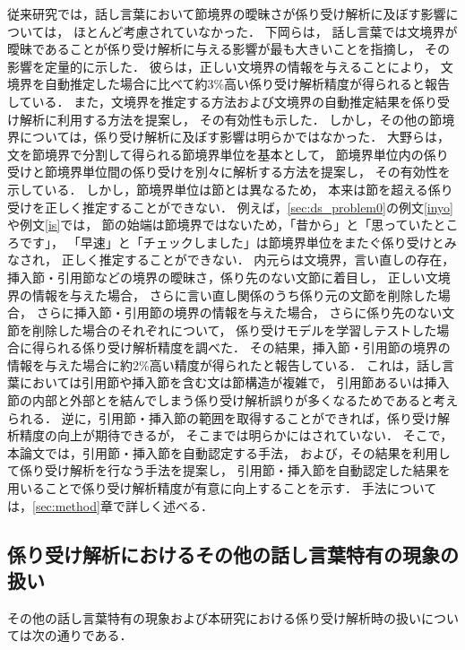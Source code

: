 \documentclass[japanese]{jnlp_1.4}
\begin{document}
従来研究では，話し言葉において節境界の曖昧さが係り受け解析に及ぼす影響については，
ほとんど考慮されていなかった．
下岡ら\cite{shitaoka_2005}は，
話し言葉では文境界が曖昧であることが係り受け解析に与える影響が最も大きいことを指摘し，
その影響を定量的に示した．
彼らは，正しい文境界の情報を与えることにより，
文境界を自動推定した場合に比べて約3\%高い係り受け解析精度が得られると報告している．
また，文境界を推定する方法および文境界の自動推定結果を係り受け解析に利用する方法を提案し，
その有効性も示した．
しかし，その他の節境界については，係り受け解析に及ぼす影響は明らかではなかった．
大野ら\cite{Ohno:coling-acl2006}は，文を節境界で分割して得られる節境界単位を基本として，
節境界単位内の係り受けと節境界単位間の係り受けを別々に解析する方法を提案し，
その有効性を示している．
しかし，節境界単位は節とは異なるため，
本来は節を超える係り受けを正しく推定することができない．
例えば，\ref{sec:ds_problem0}の例文\ref{inyo}や例文\ref{is}では，
節の始端は節境界ではないため，「昔から」と「思っていたところです」，
「早速」と「チェックしました」は節境界単位をまたぐ係り受けとみなされ，
正しく推定することができない．
内元ら\cite{Uchimoto:lrec2006a}は文境界，言い直しの存在，
挿入節・引用節などの境界の曖昧さ，係り先のない文節に着目し，
正しい文境界の情報を与えた場合，
さらに言い直し関係のうち係り元の文節を削除した場合，
さらに挿入節・引用節の境界の情報を与えた場合，
さらに係り先のない文節を削除した場合のそれぞれについて，
係り受けモデルを学習しテストした場合に得られる係り受け解析精度を調べた．
その結果，挿入節・引用節の境界の情報を与えた場合に約2\%高い精度が得られたと報告している．
これは，話し言葉においては引用節や挿入節を含む文は節構造が複雑で，
引用節あるいは挿入節の内部と外部とを結んでしまう係り受け解析誤りが多くなるためであると考えられる．
逆に，引用節・挿入節の範囲を取得することができれば，係り受け解析精度の向上が期待できるが，
そこまでは明らかにはされていない．
そこで，本論文では，引用節・挿入節を自動認定する手法，
および，その結果を利用して係り受け解析を行なう手法を提案し，
引用節・挿入節を自動認定した結果を用いることで係り受け解析精度が有意に向上することを示す．
手法については，\ref{sec:method}章で詳しく述べる．


\subsection{係り受け解析におけるその他の話し言葉特有の現象の扱い}\label{sec:ds_problem2}

その他の話し言葉特有の現象および本研究における係り受け解析時の扱いについては次の通りである．
\end{document}
